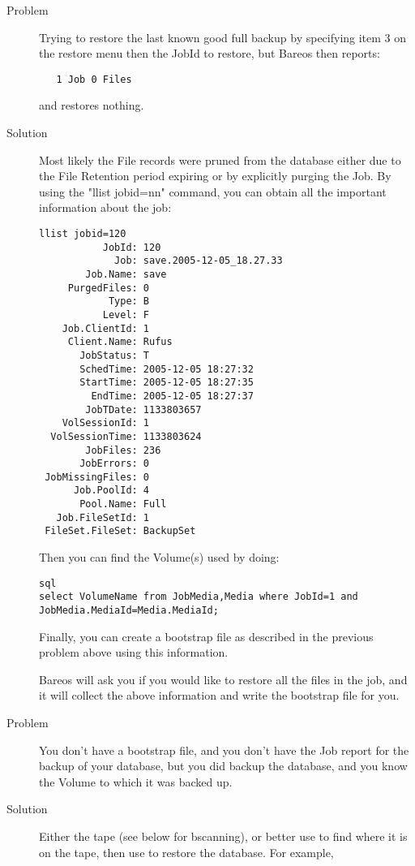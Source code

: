 \begin{description}
\item [Problem]
   Trying to restore the last known good full backup by specifying
   item 3 on the restore menu then the JobId to restore, but Bareos
   then reports:

\footnotesize
\begin{verbatim}
   1 Job 0 Files
\end{verbatim}
\normalsize
   and restores nothing.

\item[Solution]
   Most likely the File records were pruned from the database either due
   to the File Retention period expiring or by explicitly purging the
   Job. By using the "llist jobid=nn" command, you can obtain all the
   important information about the job:

\footnotesize
\begin{verbatim}
llist jobid=120
           JobId: 120
             Job: save.2005-12-05_18.27.33
        Job.Name: save
     PurgedFiles: 0
            Type: B
           Level: F
    Job.ClientId: 1
     Client.Name: Rufus
       JobStatus: T
       SchedTime: 2005-12-05 18:27:32
       StartTime: 2005-12-05 18:27:35
         EndTime: 2005-12-05 18:27:37
        JobTDate: 1133803657
    VolSessionId: 1
  VolSessionTime: 1133803624
        JobFiles: 236
       JobErrors: 0
 JobMissingFiles: 0
      Job.PoolId: 4
       Pool.Name: Full
   Job.FileSetId: 1
 FileSet.FileSet: BackupSet
\end{verbatim}
\normalsize

   Then you can find the Volume(s) used by doing:

\footnotesize
\begin{verbatim}
sql
select VolumeName from JobMedia,Media where JobId=1 and JobMedia.MediaId=Media.MediaId;
\end{verbatim}
\normalsize

   Finally, you can create a bootstrap file as described in the previous
   problem above using this information.

   Bareos will ask you if
   you would like to restore all the files in the job, and it will
   collect the above information and write the bootstrap file for
   you.

\item [Problem]
  You don't have a bootstrap file, and you don't have the Job report for
  the backup of your database, but you did backup the database, and you
  know the Volume to which it was backed up.

\item [Solution]
  Either  the tape (see below for bscanning), or better use 
  to find where it is on the tape, then use  to
  restore the database.  For example,



\end{description}
